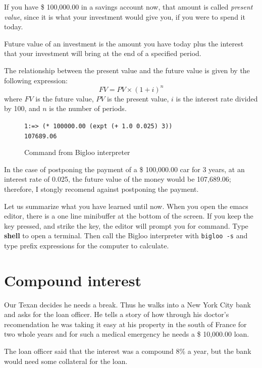 \documentclass[a4paper,12pt]{book}
\newenvironment{fmpage}[1]
           {\begin{lrbox}{\fmbox}\begin{minipage}{#1}}
           {\end{minipage}\end{lrbox}\fbox{\usebox{\fmbox}}}
\begin{document}
If you have \$ 100,000.00 in a savings account
now, that amount is called {\em present value},
since it is what your investment would give you,
if you were to spend it today.

Future value of an investment is the amount
you have today plus the interest that your
investment will bring at the end of a
specified period.

The relationship between the present value
and the future value is given by the
following expression:
\begin{equation}
FV= PV\times (1+i)^n
\label{eq:future-value}
\end{equation}
where $FV$ is the future value, $PV$ is the present
value, $i$ is the interest rate divided by 100,
and $n$ is the number of periods.

\begin{figure}[!h]
\begin{fmpage}{0.8\textwidth}
\verb|1:=> (* 100000.00 (expt (+ 1.0 0.025) 3))|\\
\verb|107689.06|
\end{fmpage}
\caption{Command from Bigloo interpreter}
\label{future-value}
\end{figure}

In the case of postponing the payment of a \$ 100,000.00 car
for 3 years, at an interest rate of 0.025, the future
value of the money would be 107,689.06; therefore,
I stongly recomend against postponing the payment.

Let us summarize what you have learned until now.
When you open the emacs editor, there is
a one line minibuffer at the bottom of the screen.
If you keep the  key pressed,
and strike the   key, the editor
will prompt you for command. Type {\bf shell}
to open a terminal. Then call the Bigloo interpreter
with \verb|bigloo -s| and type prefix expressions
for the computer to calculate.


\section{Compound interest}

Our Texan decides he needs a break. Thus he walks into
a New York City bank and asks for the loan officer.
He tells a story of how through his doctor's recomendation
he was taking it easy at his property in the south of
France for two whole years and for such a medical
emergency he needs a \$ 10,000.00 loan.

The loan officer said that the interest was a compound 8\%
a year, but the bank would need some collateral for the loan.
\end{document}
